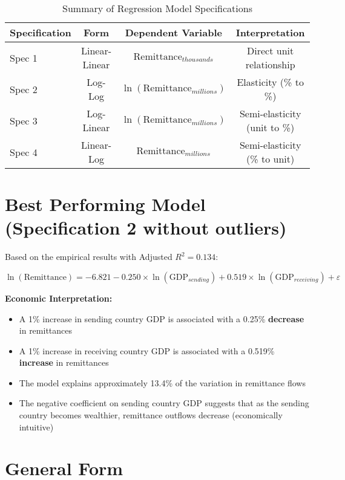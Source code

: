\documentclass{article}
\begin{document}
\begin{table}[h!]
\centering
\caption{Summary of Regression Model Specifications}
\begin{tabular}{@{}lccc@{}}
\toprule
\textbf{Specification} & \textbf{Form} & \textbf{Dependent Variable} & \textbf{Interpretation} \\
\midrule
Spec 1 & Linear-Linear & $\text{Remittance}_{thousands}$ & Direct unit relationship \\
Spec 2 & Log-Log & $\ln(\text{Remittance}_{millions})$ & Elasticity (\% to \%) \\
Spec 3 & Log-Linear & $\ln(\text{Remittance}_{millions})$ & Semi-elasticity (unit to \%) \\
Spec 4 & Linear-Log & $\text{Remittance}_{millions}$ & Semi-elasticity (\% to unit) \\
\bottomrule
\end{tabular}
\end{table}

\section{Best Performing Model (Specification 2 without outliers)}

Based on the empirical results with Adjusted $R^2 = 0.134$:

\begin{equation}
\ln(\text{Remittance}) = -6.821 - 0.250 \times \ln(\text{GDP}_{sending}) + 0.519 \times \ln(\text{GDP}_{receiving}) + \varepsilon
\end{equation}

\textbf{Economic Interpretation:}
\begin{itemize}
    \item A 1\% increase in sending country GDP is associated with a 0.25\% \textbf{decrease} in remittances
    \item A 1\% increase in receiving country GDP is associated with a 0.519\% \textbf{increase} in remittances
    \item The model explains approximately 13.4\% of the variation in remittance flows
    \item The negative coefficient on sending country GDP suggests that as the sending country becomes wealthier, remittance outflows decrease (economically intuitive)
\end{itemize}

\section{General Form}
\end{document}

